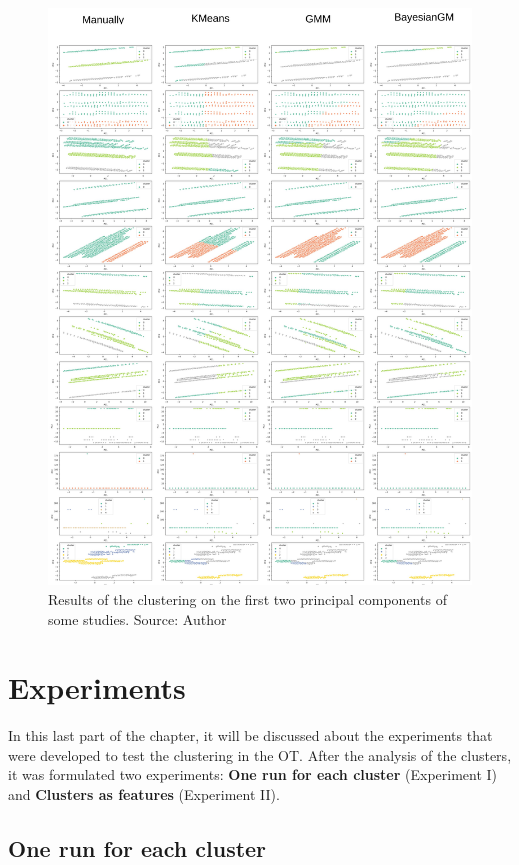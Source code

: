 \begin{figure}[H]
   \centering
   \includegraphics[width=\linewidth]{fig/ch3-clustering-studies.png}
   \caption{Results of the clustering on the first two principal components of some studies. Source: Author}
   \label{fig:clustering-studies}
\end{figure}

\section{Experiments}

In this last part of the chapter, it will be discussed about the experiments that were developed to test the clustering in the OT. After the analysis of the clusters, it was formulated two experiments: \textbf{One run for each cluster} (Experiment I) and \textbf{Clusters as features} (Experiment II).

\subsection{One run for each cluster}
\label{ch:experiment-i}

